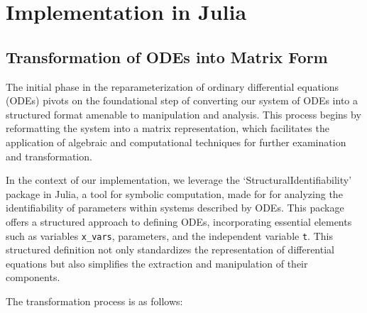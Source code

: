 \documentclass[oneside, a4paper, onecolumn, 11pt]{article}
\begin{document}
\newpage

\section{Implementation in Julia}

\subsection{Transformation of ODEs into Matrix Form}

The initial phase in the reparameterization of ordinary differential equations (ODEs) pivots on the foundational step of converting our system of ODEs into a structured format amenable to manipulation and analysis. This process begins by reformatting the system into a matrix representation, which facilitates the application of algebraic and computational techniques for further examination and transformation.

In the context of our implementation, we leverage the `StructuralIdentifiability' \cite{structidjl} package in Julia, a tool for symbolic computation, made for for analyzing the identifiability of parameters within systems described by ODEs. This package offers a structured approach to defining ODEs, incorporating essential elements such as variables \texttt{x\_vars}, parameters, and the independent variable \texttt{t}. This structured definition not only standardizes the representation of differential equations but also simplifies the extraction and manipulation of their components.

The transformation process is as follows:
\end{document}
